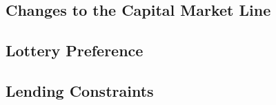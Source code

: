 \subsection{Changes to the Capital Market Line}


\subsection{Lottery Preference}


\subsection{Lending Constraints}

